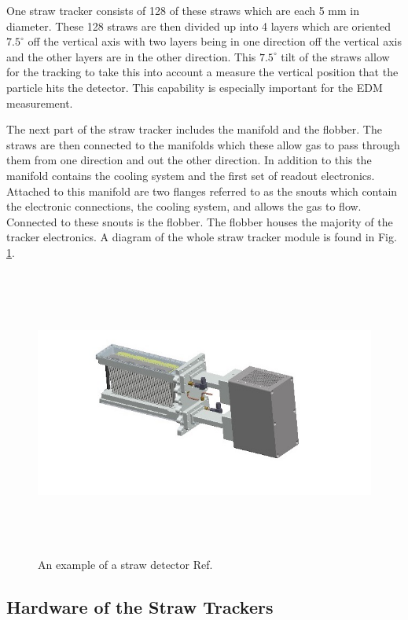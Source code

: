 \documentclass[./Thesis]{subfiles}
\begin{document}
	 One straw tracker consists of 128 of these straws which are each 5 mm in diameter.  These 128 straws are then divided up into 4 layers which are oriented $7.5^\circ$ off the vertical axis with two layers being in one direction off the vertical axis and the other layers are in the other direction.  This $7.5^\circ$ tilt of the straws allow for the tracking to take this into account a measure the vertical position that the particle hits the detector.  This capability is especially important for the EDM measurement. 
	 
	 The next part of the straw tracker includes the manifold and the flobber.  The straws are then connected to the manifolds which these allow gas to pass through them from one direction and out the other direction.  In addition to this the manifold contains the cooling system and the first set of readout electronics.  Attached to this manifold are two flanges referred to as the snouts which contain the electronic connections, the cooling system, and allows the gas to flow.  Connected to these snouts is the flobber.  The flobber houses the majority of the tracker electronics.  A diagram of the whole straw tracker module is found in Fig. \ref{fig:StrawDetector}.

	
\begin{figure}
	\centerline{\includegraphics[height=95mm]{StrawDetector.jpg}}
	\caption[ A Straw Detector]{ An example of a straw detector Ref. \cite{TDR}
	}
	\label{fig:StrawDetector}
\end{figure} 

\subsection{Hardware of the Straw Trackers}
\end{document}

